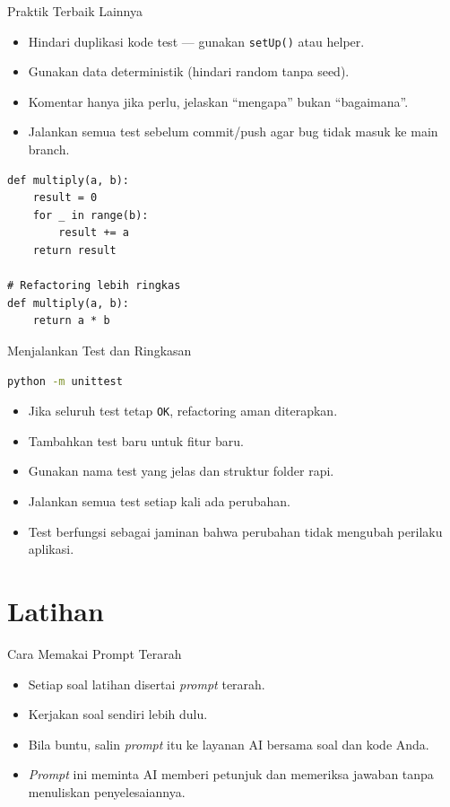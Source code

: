 \documentclass[aspectratio=169, table]{beamer}
\begin{document}
\begin{frame}[fragile]{Praktik Terbaik Lainnya}
\vspace*{20pt}
\begin{itemize}
  \item Hindari duplikasi kode test — gunakan \texttt{setUp()} atau helper.
  \item Gunakan data deterministik (hindari random tanpa seed).
  \item Komentar hanya jika perlu, jelaskan “mengapa” bukan “bagaimana”.
  \item Jalankan semua test sebelum commit/push agar bug tidak masuk ke main branch.
\end{itemize}

\begin{lstlisting}[style=PythonStyle, caption={Refactoring aman pada fungsi multiply()}]
def multiply(a, b):
    result = 0
    for _ in range(b):
        result += a
    return result

# Refactoring lebih ringkas
def multiply(a, b):
    return a * b
\end{lstlisting}
\end{frame}

\begin{frame}[fragile]{Menjalankan Test dan Ringkasan}
\vspace*{20pt}
\begin{lstlisting}[language=bash, caption={Menjalankan ulang semua test}]
python -m unittest
\end{lstlisting}

\begin{itemize}
  \item Jika seluruh test tetap \texttt{OK}, refactoring aman diterapkan.
  \item Tambahkan test baru untuk fitur baru.
  \item Gunakan nama test yang jelas dan struktur folder rapi.
  \item Jalankan semua test setiap kali ada perubahan.
  \item Test berfungsi sebagai jaminan bahwa perubahan tidak mengubah perilaku aplikasi.
\end{itemize}
\end{frame}

\section{Latihan}
\begin{frame}{Cara Memakai Prompt Terarah}
\begin{itemize}
\item Setiap soal latihan disertai \textit{prompt} terarah.
\item Kerjakan soal sendiri lebih dulu.
\item Bila buntu, salin \textit{prompt} itu ke layanan AI bersama soal dan kode Anda.
\item \textit{Prompt} ini meminta AI memberi petunjuk dan memeriksa jawaban tanpa menuliskan penyelesaiannya.
\end{itemize}
\end{frame}
\end{document}
